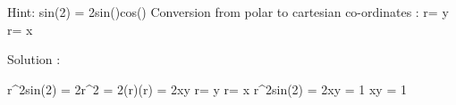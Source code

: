 Hint:
sin(2\Theta) = 2\cdot sin(\Theta )\cdot cos(\Theta )
Conversion from polar to cartesian co-ordinates :
r\sin \Theta = y
r\cos  \Theta = x

Solution : 

r^{2}sin(2\Theta ) = 2\cdot r^{2}\cdot \sin \Theta\cdot  \cos \Theta 
                   = 2\cdot (r\cdot \cos \Theta )\cdot (r\cdot \sin \Theta )
                   = 2\cdot x\cdot y
                    \because r\sin \Theta = y
                             r\cos  \Theta = x
\Rightarrow r^{2}sin(2\Theta ) = 2\cdot x\cdot y = 1
\cdot x\cdot y = 1